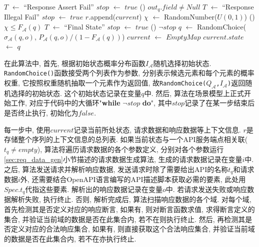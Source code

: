 \begin{algorithm}
{{{{{{                                	$T$ $\gets$ ``Response Assert Fail''\;
                                    $stop$ $\gets$ $true$\;
                                }
                            }
                            \If() {$out_q.field \neq Null$} {
                            	 {
                                	$T$ $\gets$ ``Response Illegal Fail''\;
                                    $stop$ $\gets$ $true$\;
                                }
                            }
                        }
                    }
                }
                $r$.append($current$)\;
                 {
                	$\chi$ $\gets$ RandomNumber($U(0,1)$)\;
                    \If() {$\chi \le F_{\mathcal{A}}(q)$} {
                    	$T$ $\gets$ ``Final State''\;
                        $stop$ $\gets$ $true$\;
                    }
                }
            	\If() {$\neg stop$} {
                	$q$ $\gets$ RandomChoice($\sigma_{\mathcal{A}}(q,o)$, $P_{\mathcal{A}}(q,o) / \left(1 - F_{\mathcal{A}}(q)\right)$)\;
                    $current$ $\gets$ $EmptyMap$\;
                    $current.state$ $\gets$ $q$\;
                }
            }

            \label{algo:seqgen}
        \end{algorithm}
        
        在此算法中, 首先, 根据初始状态概率分布函数$I_{\mathcal{A}}$随机选择初始状态. \texttt{RandomChoice()}函数接受两个列表作为参数, 分别表示候选元素和每个元素的概率权重, 它按照权重随机抽取一个元素作为返回值, 故\texttt{RandomChoice(}$Q_{\mathcal{A}}$\texttt{,}$I_{\mathcal{A}}$\texttt{)}返回随机选择的初始状态. 这个初始状态记录在变量$q$中. 然后, 算法在场景模型上正式开始工作, 对应于代码中的大循环"\textbf{while} $\neg stop$ \textbf{do}", 其中$stop$记录了在某一步结束后是否终止执行, 初始化为$false$. 
        
        每一步中, 使用$current$记录当前所处状态, 请求数据和响应数据等上下文信息. $r$是存储整个序列的上下文信息的总列表. 如果当前状态与一个API服务端点相关联($t_q \neq empty$), 算法将遍历请求数据的各个参数定义, 分别对各个参数运行\ref{sec:req_data_gen}小节描述的请求数据生成算法, 生成的请求数据记录在变量$i$中. 之后, 算法发送请求并解析响应数据, 发送请求时除了需要给出API的名称$t_q$和请求数据$i$外, 还需要结合OpenAPI语言编写的API描述脚本获取必需的要素, 此处用$Spec.t_q$代指这些要素. 解析出的响应数据记录在变量$o$中. 若请求发送失败或响应数据解析失败, 执行终止. 否则, 解析完成后, 算法扫描响应数据的各个域. 对每个域, 首先检测其是否定义对应的响应断言, 如果有, 则对断言函数求值, 求得断言定义的集合, 并验证当前域的数据是否在此集合内, 若不在则执行终止. 然后, 再检测其是否定义对应的合法响应集合, 如果有, 则直接获取这个合法响应集合, 并验证当前域的数据是否在此集合内, 若不在亦执行终止.
        

